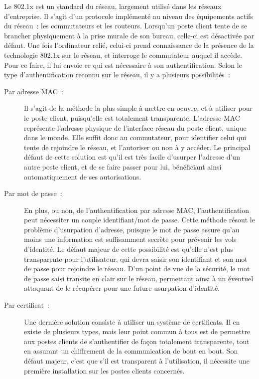 Le 802.1x est un standard du réseau, largement utilisé dans les réseaux d'entreprise. Il s'agit d'un protocole implémenté au niveau des équipements actifs du réseau~: les commutateurs et les routeurs. Lorsqu'un poste client tente de se brancher physiquement à la prise murale de son bureau, celle-ci est désactivée par défaut. Une fois l'ordinateur relié, celui-ci prend connaissance de la présence de la technologie 802.1x sur le réseau, et interroge le commutateur auquel il accède. Pour ce faire, il lui envoie ce qui est nécessaire à son authentification. Selon le type d'authentification reconnu sur le réseau, il y a plusieurs possibilités~:

\begin{description}
\item[Par adresse MAC~:] Il s'agit de la méthode la plus simple à mettre en oeuvre, et à utiliser pour le poste client, puisqu'elle est totalement transparente. L'adresse MAC représente l'adresse physique de l'interface réseau du poste client, unique dans le monde. Elle suffit donc au commutateur, pour identifier celui qui tente de rejoindre le réseau, et l'autoriser ou non à y accéder. Le principal défaut de cette solution est qu'il est très facile d'usurper l'adresse d'un autre poste client, et de se faire passer pour lui, bénéficiant ainsi automatiquement de ses autorisations.
\item[Par mot de passe~:] En plus, ou non, de l'authentification par adresse MAC, l'authentification peut nécessiter un couple identifiant/mot de passe. Cette méthode résout le problème d'usurpation d'adresse, puisque le mot de passe assure qu'au moins une information est suffisamment secrète pour prévenir les vols d'identité. Le défaut majeur de cette possibilité est qu'elle n'est plus transparente pour l'utilisateur, qui devra saisir son identifiant et son mot de passe pour rejoindre le réseau. D'un point de vue de la sécurité, le mot de passe saisi transite en clair sur le réseau, permettant ainsi à un éventuel attaquant de le récupérer pour une future usurpation d'identité.
\item[Par certificat~:] Une dernière solution consiste à utiliser un système de certificats. Il en existe de plusieurs types, mais leur point commun à tous est de permettre aux postes clients de s'authentifier de façon totalement transparente, tout en assurant un chiffrement de la communication de bout en bout. Son défaut majeur, c'est que s'il est transparent à l'utilisation, il nécessite une première installation sur les postes clients concernés.
\end{description}

